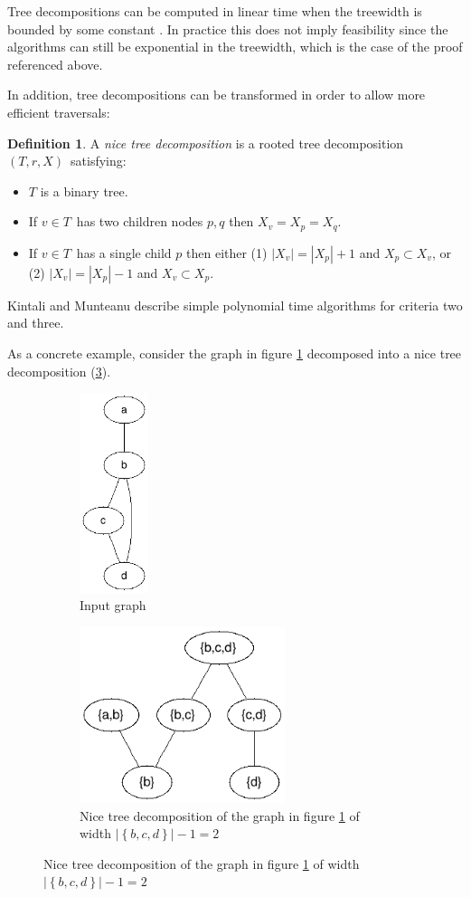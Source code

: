 \documentclass[a4paper,11pt]{report}
\theoremstyle{plain}
\theoremstyle{definition}
\newtheorem{defn}[thm]{Definition} %
\begin{document}
Tree decompositions can be computed in linear time when the treewidth is bounded by some constant \cite{bodlaender96}.
In practice this does not imply feasibility since the algorithms can still be exponential in the treewidth, which is the case of the proof referenced above.

In addition, tree decompositions can be transformed in order to allow more efficient traversals:

\begin{defn}
A \emph{nice tree decomposition} is a rooted tree decomposition $(T, r, X)$ satisfying:
\begin{itemize}
\item $T$ is a binary tree.
\item If $v \in T$ has two children nodes $p, q$ then $X_v = X_p = X_q$.
\item If $v \in T$ has a single child $p$ then either
  (1) $|X_v| = |X_p| + 1$ and $X_p \subset X_v$, or (2) $|X_v| = |X_p| - 1$ and $X_v \subset X_p$.
\end{itemize}
\end{defn}

Kintali and Munteanu \cite{kintali12} describe simple polynomial time algorithms for criteria two and three.

As a concrete example, consider the graph in figure \ref{fig:arbitrary-graph} decomposed into a nice tree decomposition (\ref{fig:decomp-graph}).

\begin{figure}[here]
\centering
\begin{subfigure}[b]{\linewidth}
\centering
\includegraphics[width=2cm]{images/input_graph.png} 
\caption[Graph]{Input graph}
\label{fig:arbitrary-graph}
\end{subfigure}
\begin{subfigure}[b]{\linewidth}
\centering
\includegraphics[width=6cm]{images/nice_tree_decomp.png} 
\caption[Decomposition]{Nice tree decomposition of the graph in figure \ref{fig:arbitrary-graph} of width $|\left\{b, c, d\right\}| - 1 = 2$}
\label{fig:decomp-graph}
\end{subfigure}
\end{figure}
\end{document}
